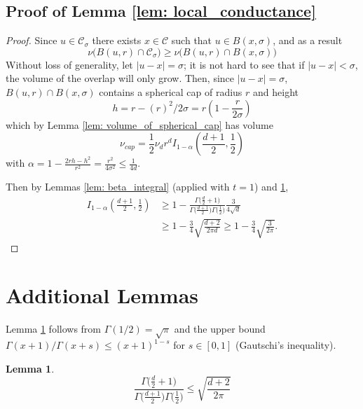 \documentclass{article}
\newcommand{\abs}[1]{\left \lvert #1 \right \rvert}
\newcommand{\Cset}{\mathcal{C}}
\newcommand{\Csig}{\Cset_{\sigma}}
\newcommand{\1}{\mathbf{1}}
\theoremstyle{alden}
\theoremstyle{aldenthm}
\newtheorem{lemma}{Lemma}
\theoremstyle{remark}
\begin{document}
\subsection{Proof of Lemma \ref{lem: local_conductance}}
\begin{proof}
	Since $u \in \Csig$ there exists $x \in \Cset$ such that $u \in B(x, \sigma)$, and as a result
	\begin{equation*}
	{\nu}\bigl(B(u, r) \cap \Csig \bigr) \geq \nu\bigl(B(u, r) \cap B(x, \sigma)\bigr)
	\end{equation*}
	Without loss of generality, let $\abs{u  - x} = \sigma$; it is not hard to see that if $\abs{u - x} < \sigma$, the volume of the overlap will only grow. Then, since $\abs{u  - x} = \sigma$, $B(u, r) \cap B(x, \sigma)$ contains a spherical cap of radius $r$ and height
	\begin{equation*}
	h = r - (r)^2/2\sigma = r \left( 1 - \frac{r}{2 \sigma} \right)
	\end{equation*}	
	which by Lemma \ref{lem: volume_of_spherical_cap} has volume
	\begin{equation*}
	\nu_{cap} = \frac{1}{2} \nu_d r^d I_{1 - \alpha}\left( \frac{d + 1}{2}  ,\frac{1}{2}\right)
	\end{equation*}
	with $\alpha = 1 - \frac{2rh - h^2}{r^2} = \frac{r^2}{4 \sigma^2} \leq \frac{1}{4d}$. 
	
	Then by Lemmas \ref{lem: beta_integral} (applied with $t = 1$) and \ref{lem: beta_function},
	\begin{align*}
	I_{1 - \alpha}\left( \frac{d + 1}{2}  ,\frac{1}{2}\right) & \geq 1 - \frac{\Gamma\bigl(\frac{d}{2}+ 1\bigr)}{\Gamma\bigl(\frac{d + 1}{2}\bigr) \Gamma\bigl(\frac{1}{2}\bigr)} \frac{3}{4 \sqrt{d}} \\
	& \geq 1 - \frac{3}{4}\sqrt{\frac{d+2}{2 \pi d}} \geq 1 - \frac{3}{4}\sqrt{\frac{3}{2 \pi}}.
	\end{align*}
\end{proof}

\section{Additional Lemmas}
Lemma \ref{lem: beta_function} follows from $\Gamma(1/2) = \sqrt{\pi}$ and the upper bound $\Gamma(x + 1)/ \Gamma(x+s) \leq (x + 1)^{1-s}$ for $s \in [0,1]$ (Gautschi's inequality).
\begin{lemma}
	\label{lem: beta_function}
	\begin{equation*}
	\frac{\Gamma\bigl(\frac{d}{2}+ 1\bigr)}{\Gamma\bigl(\frac{d + 1}{2}\bigr) \Gamma\bigl(\frac{1}{2}\bigr)} \leq \sqrt{\frac{d + 2}{2\pi}}
	\end{equation*}
\end{lemma}
\end{document}
